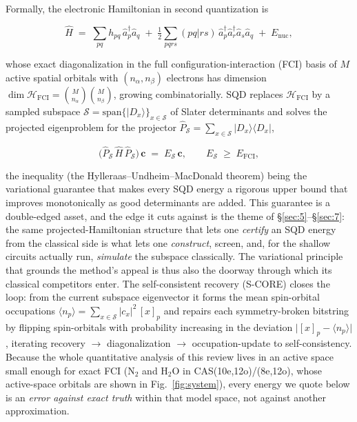 \documentclass[11pt]{article}
\begin{document}
Formally, the electronic Hamiltonian in second quantization is

\begin{equation}
\hat H \;=\; \sum_{pq} h_{pq}\, \hat a_p^{\dagger}\hat a_q \;+\; \tfrac{1}{2}\!\sum_{pqrs} (pq|rs)\, \hat a_p^{\dagger}\hat a_r^{\dagger}\hat a_s\hat a_q \;+\; E_{\mathrm{nuc}},
\end{equation}

whose exact diagonalization in the full configuration-interaction (FCI) basis of $M$ active spatial orbitals with $(n_\alpha,n_\beta)$ electrons has dimension $\dim\mathcal H_{\mathrm{FCI}} = \binom{M}{n_\alpha}\binom{M}{n_\beta}$, growing combinatorially. SQD replaces $\mathcal H_{\mathrm{FCI}}$ by a sampled subspace $\mathcal S = \mathrm{span}\{|D_x\rangle\}_{x\in\mathcal S}$ of Slater determinants and solves the projected eigenproblem for the projector $\hat P_{\mathcal S}=\sum_{x\in\mathcal S}|D_x\rangle\langle D_x|$,

\begin{equation}
\big(\hat P_{\mathcal S}\,\hat H\,\hat P_{\mathcal S}\big)\,\mathbf c \;=\; E_{\mathcal S}\,\mathbf c, \qquad E_{\mathcal S} \;\ge\; E_{\mathrm{FCI}},
\end{equation}

the inequality (the Hylleraas--Undheim--MacDonald theorem) being the variational guarantee that makes every SQD energy a rigorous upper bound that improves monotonically as good determinants are added. This guarantee is a double-edged asset, and the edge it cuts against is the theme of \S\ref{sec:5}--\S\ref{sec:7}: the same projected-Hamiltonian structure that lets one \emph{certify} an SQD energy from the classical side is what lets one \emph{construct}, screen, and, for the shallow circuits actually run, \emph{simulate} the subspace classically. The variational principle that grounds the method's appeal is thus also the doorway through which its classical competitors enter. The self-consistent recovery (S-CORE) closes the loop: from the current subspace eigenvector it forms the mean spin-orbital occupations $\langle n_p\rangle = \sum_{x\in\mathcal S} |c_x|^2\, [x]_p$ and repairs each symmetry-broken bitstring by flipping spin-orbitals with probability increasing in the deviation $\big|[x]_p-\langle n_p\rangle\big|$, iterating recovery $\to$ diagonalization $\to$ occupation-update to self-consistency. Because the whole quantitative analysis of this review lives in an active space small enough for exact FCI (N$_2$ and H$_2$O in CAS(10e,12o)/(8e,12o), whose active-space orbitals are shown in Fig.~\ref{fig:system}), every energy we quote below is an \emph{error against exact truth} within that model space, not against another approximation.
\end{document}

